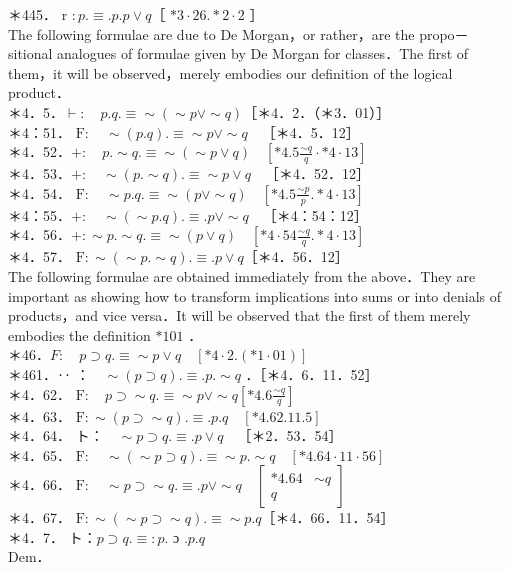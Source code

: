 \documentclass[10pt]{article}
\begin{document}
＊445． r $: p . \equiv . p . p \vee q$［ $* 3 \cdot 26 . * 2 \cdot 2$ ］\\
The following formulae are due to De Morgan，or rather，are the propo－ sitional analogues of formulae given by De Morgan for classes．The first of them，it will be observed，merely embodies our definition of the logical product．\\
＊4．5．$\vdash: \quad p . q . \equiv \sim(\sim p \vee \sim q)$［＊4．2．（＊3．01）］\\
＊4：51． $\mathrm{F}: \quad \sim(p . q) . \equiv \sim p \vee \sim q \quad$［＊4．5．12］\\
＊4．52．$+: \quad p . \sim q . \equiv \sim(\sim p \vee q) \quad\left[* 4.5 \frac{\sim q}{q} \cdot * 4 \cdot 13\right]$\\
＊4．53．$+: \quad \sim(p . \sim q) . \equiv \sim p \vee q \quad$［＊4．52．12］\\
＊4．54． $\mathrm{F}: \quad \sim p . q . \equiv \sim(p \vee \sim q) \quad\left[* 4.5 \frac{\sim p}{p} . * 4 \cdot 13\right]$\\
＊4：55．$+: \quad \sim(\sim p . q) . \equiv . p \vee \sim q \quad$［＊4：54：12］\\
＊4．56．$+: \sim p . \sim q . \equiv \sim(p \vee q) \quad\left[* 4 \cdot 54 \frac{\sim q}{q} . * 4 \cdot 13\right]$\\
＊4．57． $\mathrm{F}: \sim(\sim p . \sim q) . \equiv . p \vee q$［＊4．56．12］\\
The following formulae are obtained immediately from the above．They are important as showing how to transform implications into sums or into denials of products，and vice versa．It will be observed that the first of them merely embodies the definition $* 101$ ．\\
＊46．$F: \quad p \supset q . \equiv \sim p \vee q \quad[* 4 \cdot 2 .(* 1 \cdot 01)]$\\
＊461．‥ ：$\quad \sim(p \supset q) . \equiv . p . \sim q$ ．［＊4．6．11．52］\\
＊4．62． $\mathrm{F}: \quad p \supset \sim q . \equiv \sim p \vee \sim q\left[* 4.6 \frac{\sim q}{q}\right]$\\
＊4．63． $\mathrm{F}: \sim(p \supset \sim q) . \equiv . p . q \quad[* 4.62 .11 .5]$\\
＊4．64． ト：$\quad \sim p \supset q . \equiv . p \vee q \quad$［＊2．53．54］\\
＊4．65． $\mathrm{F}: \quad \sim(\sim p \supset q) . \equiv \sim p . \sim q \quad[* 4.64 \cdot 11 \cdot 56]$\\
＊4．66． $\mathrm{F}: \quad \sim p \supset \sim q . \equiv . p \vee \sim q \quad\left[\begin{array}{lll}* 4.64 & \sim q \\ q\end{array}\right]$\\
＊4．67． $\mathrm{F}: \sim(\sim p \supset \sim q) . \equiv \sim p . q$［＊4．66．11．54］\\
＊4．7． ト：$p \supset q . \equiv: p$. ɔ $. p . q$\\
Dem．
\end{document}
